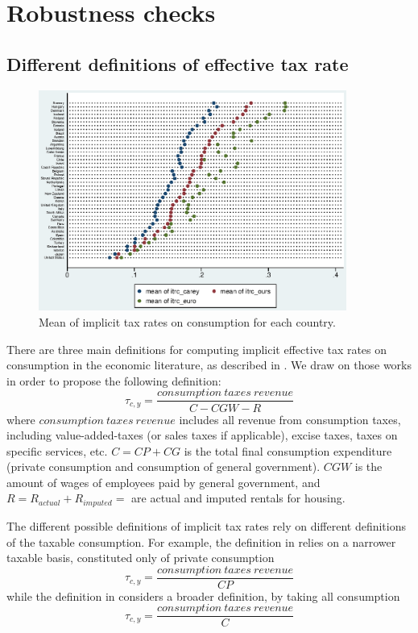 \section{Robustness checks}
\subsection{Different definitions of effective tax rate}
\label{appendix_itrc}

\begin{figure}[!ht]
\centering
\includegraphics[width=0.9\textwidth]{images/18-09_itrc_comparison}
\caption{Mean of implicit tax rates on consumption for each country.}
\label{fig:itrc_comparison}  
\end{figure}

There are three main definitions for computing implicit effective tax rates on consumption in the economic literature, as described in \cite{euro2016taxation, mendoza1994effective, carey2000average}. We draw on those works in order to propose the following definition:
\[ \tau_{c,y} = \frac{consumption\ taxes\ revenue}{C - CGW - R } \]
where $consumption\ taxes\ revenue$ includes all revenue from consumption taxes, including value-added-taxes (or sales taxes if applicable), excise taxes, taxes on specific services, etc. $C = CP + CG$ is the total final consumption expenditure (private consumption and consumption of general government). $CGW$ is the amount of wages of employees paid by general government, and $R = R_{actual} + R_{imputed} =$ are actual and imputed rentals for housing.

The different possible definitions of implicit tax rates rely on different definitions of the taxable consumption. For example, the definition in \cite{euro2016taxation} relies on a narrower taxable basis, constituted only of private consumption
\begin{equation}
    \label{itrc_euro}
    \tau_{c,y} = \frac{consumption\ taxes\ revenue}{CP}
\end{equation}
while the definition in \cite{carey2000average} considers a broader definition, by taking all consumption
\begin{equation}
    \label{itrc_carey}
    \tau_{c,y} = \frac{consumption\ taxes\ revenue}{C}
\end{equation}

